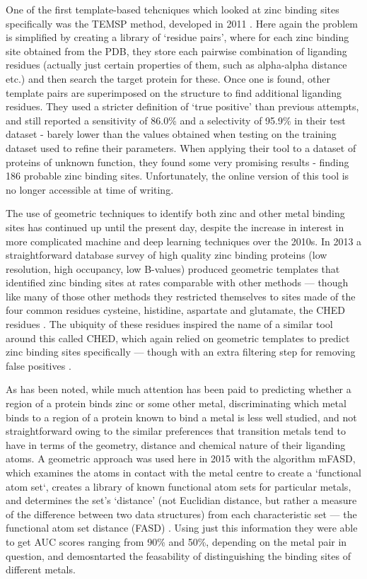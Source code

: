 One of the first template-based tehcniques which looked at zinc binding sites specifically was the TEMSP method, developed in 2011 \cite{zhao2011structure}. Here again the problem is simplified by creating a library of `residue pairs', where for each zinc binding site obtained from the PDB, they store each pairwise combination of liganding residues (actually just certain properties of them, such as alpha-alpha distance etc.) and then search the target protein for these. Once one is found, other template pairs are superimposed on the structure to find additional liganding residues. They used a stricter definition of `true positive' than previous attempts, and still reported a sensitivity of 86.0\% and a selectivity of 95.9\% in their test dataset - barely lower than the values obtained when testing on the training dataset used to refine their parameters. When applying their tool to a dataset of proteins of unknown function, they found some very promising results - finding 186 probable zinc binding sites. Unfortunately, the online version of this tool is no longer accessible at time of writing.

The use of geometric techniques to identify both zinc and other metal binding sites has continued up until the present day, despite the increase in interest in more complicated machine and deep learning techniques over the 2010s. In 2013 a straightforward database survey of high quality zinc binding proteins (low resolution, high occupancy, low B-values) produced geometric templates that identified zinc binding sites at rates comparable with other methods --- though like many of those other methods they restricted themselves to sites made of the four common residues cysteine, histidine, aspartate and glutamate, the CHED residues \cite{liu2014}. The ubiquity of these residues inspired the name of a similar tool around this called CHED, which again relied on geometric templates to predict zinc binding sites specifically --- though with an extra filtering step for removing false positives \cite{sobolev2013web}.

As has been noted, while much attention has been paid to predicting whether a region of a protein binds zinc or some other metal, discriminating which metal binds to a region of a protein known to bind a metal is less well studied, and not straightforward owing to the similar preferences that transition metals tend to have in terms of the geometry, distance and chemical nature of their liganding atoms. A geometric approach was used here in 2015 with the algorithm mFASD, which examines the atoms in contact with the metal centre to create a `functional atom set`, creates a library of known functional atom sets for particular metals, and determines the set's `distance' (not Euclidian distance, but rather a measure of the difference between two data structures) from each characteristic set --- the functional atom set distance (FASD) \cite{he2015}. Using just this information they were able to get AUC scores ranging from 90\% and 50\%, depending on the metal pair in question, and demosntarted the feasability of distinguishing the binding sites of different metals. 

